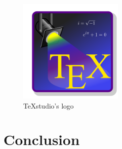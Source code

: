 \documentclass{proc}
\begin{document}
\begin{figure}[htbp]
	\caption{TeXstudio's logo}
	\begin{center}
		\includegraphics[width=2in]{TeXstudio.png}
	\end{center}
	\label{fig:TeXstudio's logo}
\end{figure}
	
	
\section{Conclusion}
	
	
\end{document}
